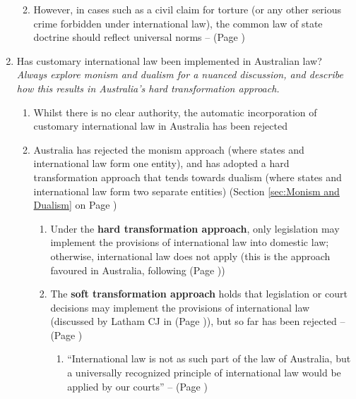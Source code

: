 \begin{enumerate}
\begin{enumerate}
\begin{enumerate}
        \end{enumerate}
        \item However, in cases such as a civil claim for torture (or any other serious crime forbidden under international law), the common law of state doctrine should reflect universal norms --  (Page \pageref{case: Habib v Commonwealth})
    \end{enumerate}
    \item Has customary international law been implemented in Australian law? \\ \textit{Always explore monism and dualism for a nuanced discussion, and describe how this results in Australia's hard transformation approach.}
    \begin{enumerate}
        \item Whilst there is no clear authority, the automatic incorporation of customary international law in Australia has been rejected
        \item Australia has rejected the monism approach (where states and international law form one entity), and has adopted a hard transformation approach that tends towards dualism (where states and international law form two separate entities) (Section \ref{sec:Monism and Dualism} on Page \pageref{sec:Monism and Dualism})
        \begin{enumerate}
            \item Under the \textbf{hard transformation approach}, only legislation may implement the provisions of international law into domestic law; otherwise, international law does not apply (this is the approach favoured in Australia, following  (Page \pageref{case:Chow Hung Ching}))
            \item The \textbf{soft transformation approach} holds that legislation or court decisions may implement the provisions of international law (discussed by Latham CJ in  (Page \pageref{case:Chow Hung Ching})), but so far has been rejected --  (Page \pageref{case: Dietrich v R})
            \begin{enumerate}
                \item ``International law is not as such part of the law of Australia, but a universally recognized principle of international law would be applied by our courts'' --  (Page \pageref{case:Chow Hung Ching})

\end{enumerate}
\end{enumerate}
\end{enumerate}
\end{enumerate}
